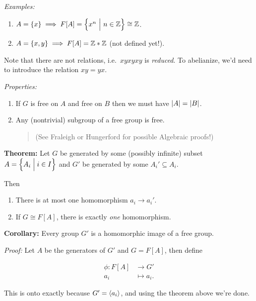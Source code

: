 \emph{Examples:}

\begin{enumerate}
\def\labelenumi{\arabic{enumi}.}
\item
  \(A = \left\{{x}\right\} \implies F[A] = \left\{{x^n {~\mathrel{\Big|}~} n \in {\mathbb{Z}}}\right\} \cong {\mathbb{Z}}\).
\item
  \(A = \left\{{x, y}\right\} \implies F[A] = {\mathbb{Z}} \ast {\mathbb{Z}}\) (not defined yet!).
\end{enumerate}

Note that there are not relations, i.e.~\(xyxyxy\) is \emph{reduced}. To
abelianize, we'd need to introduce the relation \(xy = yx\).

\emph{Properties:}

\begin{enumerate}
\def\labelenumi{\arabic{enumi}.}
\item
  If \(G\) is free on \(A\) and free on \(B\) then we must have
  \({\left\lvert {A} \right\rvert} = {\left\lvert {B} \right\rvert}\).
\item
  Any (nontrivial) subgroup of a free group is free.

  \begin{quote}
  (See Fraleigh or Hungerford for possible Algebraic proofs!)
  \end{quote}
\end{enumerate}

\textbf{Theorem:} Let \(G\) be generated by some (possibly infinite)
subset \(A = \left\{{A_i\mathrel{\Big|} i\in I}\right\}\) and \(G'\) be generated by some
\(A_i' \subseteq A_i\).

Then

\begin{enumerate}
\def\labelenumi{\alph{enumi}.}
\item
  There is at most one homomorphism \(a_i \to a_i'\).
\item
  If \(G \cong F[A]\), there is exactly \emph{one} homomorphism.
\end{enumerate}

\textbf{Corollary:} Every group \(G'\) is a homomorphic image of a free
group.

\emph{Proof:} Let \(A\) be the generators of \(G'\) and \(G = F[A]\),
then define

\begin{align*}
\phi: F[A] &\to G' \\
a_i &\mapsto a_i
.\end{align*}

This is onto exactly because \(G' = \left\langle{a_i}\right\rangle\), and using the
theorem above we're done.

